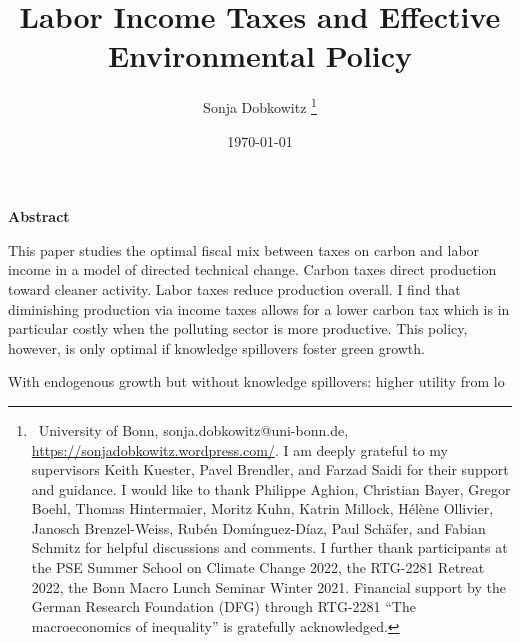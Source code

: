 \documentclass[12pt]{article}
\title{Labor Income Taxes and Effective Environmental Policy}
\author{Sonja Dobkowitz
\thanks{\ {University of Bonn, sonja.dobkowitz@uni-bonn.de, \url{https://sonjadobkowitz.wordpress.com/}.} \newline
	I am deeply grateful to my supervisors Keith Kuester, Pavel Brendler, and Farzad Saidi for their support and guidance. 
	I would like to thank Philippe Aghion, Christian Bayer, Gregor Boehl, Thomas Hintermaier,  Moritz Kuhn, Katrin Millock, Hélène Ollivier,  Janosch Brenzel-Weiss, Rubén Domínguez-Díaz, Paul Schäfer, and Fabian Schmitz for helpful discussions and comments.  
	I further thank participants at the PSE Summer School on Climate Change 2022, the RTG-2281 Retreat 2022, the Bonn Macro Lunch Seminar Winter 2021.
	Financial support by the German Research Foundation (DFG) through RTG-2281 “The macroeconomics of inequality” is gratefully acknowledged.}}
\date{\today %
}
\renewenvironment{abstract}
{\small
	\list{}{
		\setlength{\leftmargin}{0.025\textwidth}%
		\setlength{\rightmargin}{\leftmargin}%
	}%
	\item\relax}
{\endlist}
\begin{document}
%	
	\maketitle
	\begin{abstract}
		\begin{singlespacing}
			\textbf{Abstract \ }
			
			This paper studies the optimal fiscal mix between taxes on carbon and labor income in a model of directed technical change. Carbon taxes direct production toward cleaner activity. Labor taxes reduce production overall. I find that diminishing production via income taxes allows for a lower carbon tax which is in particular costly when the polluting sector is more productive. This policy, however, is only optimal if knowledge spillovers foster green growth. 
			
			With endogenous growth but without knowledge spillovers: higher utility from lo
%			

			
		\end{singlespacing}
		
		\end{abstract}






%

%
%
\clearpage

\end{document}
